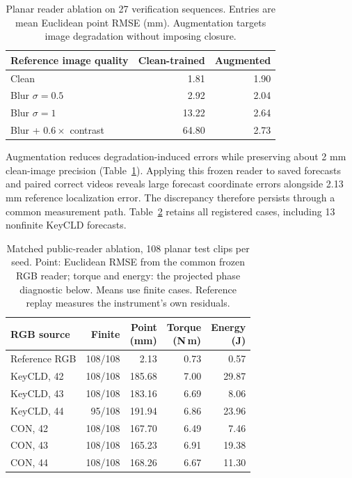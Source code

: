 \begin{table}[t]
\caption{Planar reader ablation on 27 verification sequences. Entries are mean Euclidean point RMSE (mm). Augmentation targets image degradation without imposing closure.}
\label{app:reader-quality}
\centering\small
\begin{tabular}{lrr}
\toprule
Reference image quality & Clean-trained & Augmented\\
\midrule
Clean & 1.81 & 1.90 \\
Blur $\sigma=0.5$ & 2.92 & 2.04 \\
Blur $\sigma=1$ & 13.22 & 2.64 \\
Blur + $0.6\times$ contrast & 64.80 & 2.73 \\
\bottomrule
\end{tabular}
\end{table}

Augmentation reduces degradation-induced errors while preserving about 2 mm clean-image precision (Table~\ref{app:reader-quality}). Applying this frozen reader to saved forecasts and paired correct videos reveals large forecast coordinate errors alongside 2.13 mm reference localization error. The discrepancy therefore persists through a common measurement path. Table~\ref{app:reader-paired} retains all registered cases, including 13 nonfinite KeyCLD forecasts.

\begin{table}[t]
\caption{Matched public-reader ablation, 108 planar test clips per seed. Point: Euclidean RMSE from the common frozen RGB reader; torque and energy: the projected phase diagnostic below. Means use finite cases. Reference replay measures the instrument's own residuals.}
\label{app:reader-paired}
\centering\small
\setlength{\tabcolsep}{3pt}
\begin{tabular}{lrrrr}
\toprule
RGB source & Finite & \shortstack{Point\\(mm)} & \shortstack{Torque\\(N\,m)} & \shortstack{Energy\\(J)}\\
\midrule
Reference RGB & 108/108 & 2.13 & 0.73 & 0.57 \\
KeyCLD, 42 & 108/108 & 185.68 & 7.00 & 29.87 \\
KeyCLD, 43 & 108/108 & 183.16 & 6.69 & 8.06 \\
KeyCLD, 44 & 95/108 & 191.94 & 6.86 & 23.96 \\
CON, 42 & 108/108 & 167.70 & 6.49 & 7.46 \\
CON, 43 & 108/108 & 165.23 & 6.91 & 19.38 \\
CON, 44 & 108/108 & 168.26 & 6.67 & 11.30 \\
\bottomrule
\end{tabular}
\end{table}

